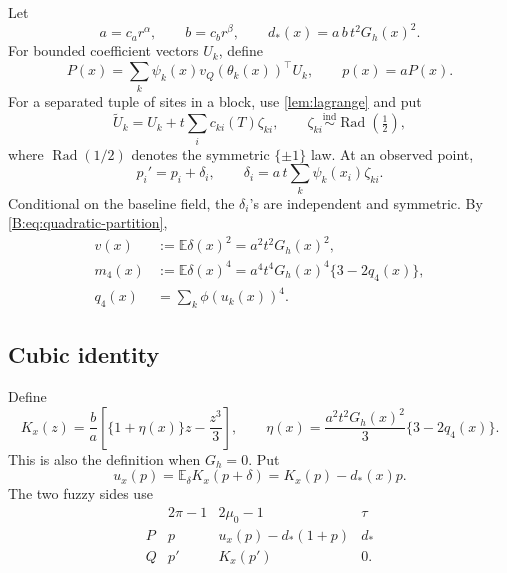 \documentclass[11pt]{article}
\DeclareMathOperator{\Rad}{Rad}
\newcommand{\E}{\mathbb{E}}
\begin{document}
Let
\begin{equation}
 a=c_ar^\alpha,\qquad
 b=c_br^\beta,\qquad
 d_*(x)=a\,b\,t^2G_h(x)^2.
 \label{B:eq:amplitudes}
\end{equation}
For bounded coefficient vectors \(U_k\), define
\begin{equation}
 P(x)=\sum_k\psi_k(x)v_Q(\theta_k(x))^\top U_k,
 \qquad p(x)=aP(x).
 \label{B:eq:p-field}
\end{equation}
For a separated tuple of sites in a block, use \cref{lem:lagrange} and put
\begin{equation}
 \widetilde U_k
 =U_k+t\sum_i c_{ki}(T)\zeta_{ki},
 \qquad
 \zeta_{ki}\stackrel{\mathrm{ind}}{\sim}\Rad(\tfrac12),
 \label{B:eq:virtual-shift}
\end{equation}
where \(\Rad(1/2)\) denotes the symmetric \(\{\pm1\}\) law.  At an
observed point,
\begin{equation}
 p_i'=p_i+\delta_i,
 \qquad
 \delta_i=a\,t\sum_k\psi_k(x_i)\zeta_{ki}.
 \label{B:eq:delta}
\end{equation}
Conditional on the baseline field, the \(\delta_i\)'s are independent and
symmetric.  By \eqref{B:eq:quadratic-partition},
\begin{align}
 v(x)&:=\E\delta(x)^2=a^2t^2G_h(x)^2,
 \label{B:eq:variance}\\
 m_4(x)&:=\E\delta(x)^4
 =a^4t^4G_h(x)^4\{3-2q_4(x)\},
 \label{B:eq:fourth-moment}\\
 q_4(x)&=\sum_k\phi(u_k(x))^4.
\end{align}

\subsection{Cubic identity}

Define
\begin{equation}
 K_x(z)
 =\frac ba\left[\{1+\eta(x)\}z-\frac{z^3}{3}\right],
 \qquad
 \eta(x)=\frac{a^2t^2G_h(x)^2}{3}\{3-2q_4(x)\}.
 \label{B:eq:cubic}
\end{equation}
This is also the definition when \(G_h=0\).  Put
\begin{equation}
 u_x(p)=\E_\delta K_x(p+\delta)=K_x(p)-d_*(x)p.
 \label{B:eq:u}
\end{equation}
The two fuzzy sides use
\begin{equation}
\begin{array}{c|ccc}
 &2\pi-1&2\mu_0-1&\tau\\ \hline
 P&p&u_x(p)-d_*(1+p)&d_*\\
 Q&p'&K_x(p')&0.
\end{array}
\label{B:eq:two-sides}
\end{equation}
\end{document}
